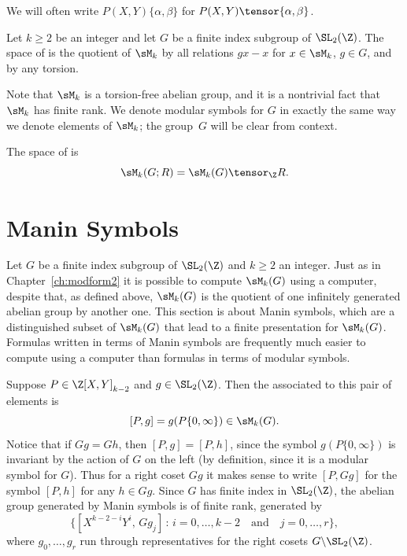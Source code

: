 We will often write 
$P(X,Y)\{\alpha,\beta\}$ for $P(X,Y)\tensor\{\alpha,\beta\}$.

\begin{definition}\label{defn:modsym}
Let $k\geq 2$ be an integer and let $G$ be a finite index subgroup of $\SL_2(\Z)$.
The space  
of  is the quotient of
$\sM_k$ by all relations $gx - x$ for $x \in \sM_k$, $g\in G$, and by any torsion.
\end{definition}
Note that $\sM_k$ is a torsion-free abelian group, and it is a
nontrivial fact that $\sM_k$ has finite rank.  We denote modular
symbols for $G$ in exactly the same way we denote elements of $\sM_k$;
the group~$G$ will be clear from context.

The space of  is
$$
  \sM_k(G;R) = \sM_k(G)\tensor_\Z R.
$$


\section{Manin Symbols}\label{sec:manin}

Let $G$ be a finite index subgroup of $\SL_2(\Z)$ and $k\geq 2$ 
an integer.
Just as in Chapter~\ref{ch:modform2} it is possible to compute
$\sM_k(G)$ using a computer, despite that, as defined above,
$\sM_k(G)$ is the quotient of one infinitely generated abelian group
by another one.  This section is about Manin symbols, which are a
distinguished subset of $\sM_k(G)$ that lead to a finite presentation
for $\sM_k(G)$.  Formulas written in terms of Manin symbols are
frequently much easier to compute using a computer than formulas in
terms of modular symbols.

Suppose $P\in \Z[X,Y]_{k-2}$ and  $g\in \SL_2(\Z)$.
Then the  associated to this
pair of elements is
$$
  [P,g] = g(P\{0,\infty\}) \in \sM_k(G).
$$
Notice that if $Gg = Gh$, then $[P,g] = [P,h]$, since 
the symbol $g(P\{0,\infty\})$ is invariant
by the action of $G$ on the left (by definition,
since it is a modular symbol for $G$).
Thus for a right coset $Gg$ it makes sense to 
write $[P, Gg]$ for the symbol $[P,h]$ for any $h\in Gg$.
Since $G$ has finite index in $\SL_2(\Z)$,
the abelian group generated by Manin symbols is of finite rank, generated by
$$
 \bigl\{ [X^{k-2-i}Y^i, \, Gg_j] \, : \, i = 0,\ldots, k-2 \quad\text{and}\quad j = 0,\ldots, r \bigr\},
$$
where $g_0, \ldots, g_r$ run through representatives for the 
right cosets $G\backslash \SL_2(\Z)$.

